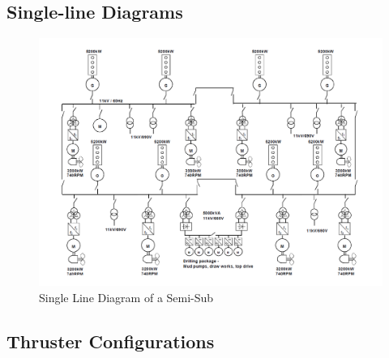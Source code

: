 \subsection{Single-line Diagrams}\label{Sec:Single-line_diagrams}
\begin{figure}[H]
    \centering
    \includegraphics[width = \textwidth ]{figures/Comp_SingleLineDiagram.png}
    \caption{Single Line Diagram of a Semi-Sub \cite{MarReg1Comp}}
    \label{fig:Comp_SingleLineDiagram}
\end{figure}



\newpage
\subsection{Thruster Configurations} \label{Sec:ThrusterConfiguratons}

